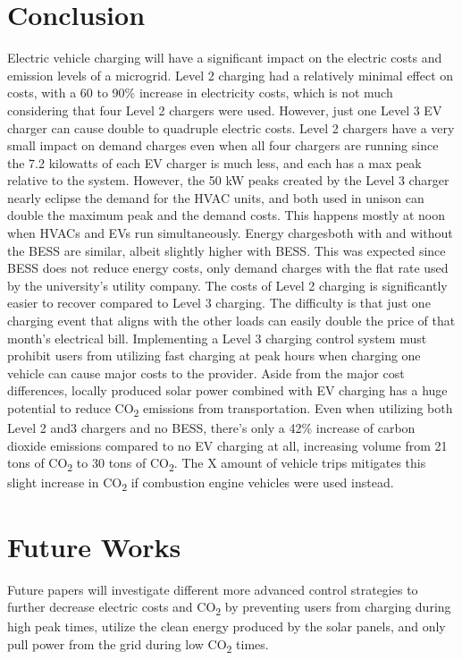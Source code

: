 \documentclass[conference]{IEEEtran}
\begin{document}
	\section{Conclusion}
		Electric vehicle charging will have a significant impact on the electric costs and emission levels of a microgrid. Level 2 charging had a relatively minimal effect on costs, with a 60 to 90\% increase in electricity costs, which is not much considering that four Level 2 chargers were used. However, just one Level 3 EV charger can cause double to quadruple electric costs. Level 2 chargers have a very small impact on demand charges even when all four chargers are running since the 7.2 kilowatts of each EV charger is much less, and each has a max peak relative to the system. However, the 50 kW peaks created by the Level 3 charger nearly eclipse the demand for the HVAC units, and both  used in unison can double the maximum peak and the demand costs. This happens mostly at noon when HVACs and EVs run simultaneously. Energy chargesboth with and without the BESS are similar, albeit slightly higher with BESS. This was expected since BESS does not reduce energy costs, only demand charges with the flat rate used by the university’s utility company. The costs of Level 2 charging is significantly easier to recover compared to Level 3 charging. The difficulty is that just one charging event that aligns with the other loads can easily double the price of that month’s electrical bill. Implementing a Level 3 charging control system must prohibit users from utilizing fast charging at peak hours when charging one vehicle can cause major costs to the provider. Aside from the major cost differences, locally produced solar power combined with EV charging has a huge potential to reduce CO\textsubscript{2} emissions from transportation. Even when utilizing both Level 2 and3 chargers and no BESS, there’s only a 42\% increase of carbon dioxide emissions compared to no EV charging at all, increasing volume from 21 tons of CO\textsubscript{2} to 30 tons of CO\textsubscript{2}. The X amount of vehicle trips mitigates this slight increase in CO\textsubscript{2} if combustion engine vehicles were used instead. 
	\section{Future Works}
	    Future papers will investigate different more advanced control strategies to further decrease electric costs and CO\textsubscript{2} by preventing users from charging during high peak times, utilize the clean energy produced by the solar panels, and only pull power from the grid during low CO\textsubscript{2} times.
		
		
		
\end{document}
